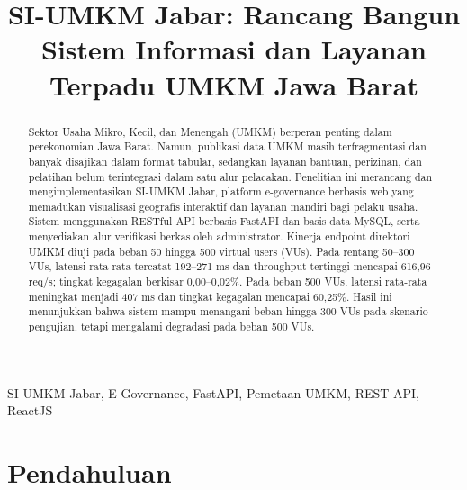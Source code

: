 \documentclass[conference]{IEEEtran}
\begin{document}
\title{SI-UMKM Jabar: Rancang Bangun Sistem Informasi dan Layanan Terpadu UMKM Jawa Barat}

\author{
}

\maketitle

\begin{abstract}
Sektor Usaha Mikro, Kecil, dan Menengah (UMKM) berperan penting dalam perekonomian Jawa Barat. Namun, publikasi data UMKM masih terfragmentasi dan banyak disajikan dalam format tabular, sedangkan layanan bantuan, perizinan, dan pelatihan belum terintegrasi dalam satu alur pelacakan. Penelitian ini merancang dan mengimplementasikan SI-UMKM Jabar, platform e-governance berbasis web yang memadukan visualisasi geografis interaktif dan layanan mandiri bagi pelaku usaha. Sistem menggunakan RESTful API berbasis FastAPI dan basis data MySQL, serta menyediakan alur verifikasi berkas oleh administrator. Kinerja endpoint direktori UMKM diuji pada beban 50 hingga 500 virtual users (VUs). Pada rentang 50--300 VUs, latensi rata-rata tercatat 192--271 ms dan throughput tertinggi mencapai 616,96 req/s; tingkat kegagalan berkisar 0,00--0,02\%. Pada beban 500 VUs, latensi rata-rata meningkat menjadi 407 ms dan tingkat kegagalan mencapai 60,25\%. Hasil ini menunjukkan bahwa sistem mampu menangani beban hingga 300 VUs pada skenario pengujian, tetapi mengalami degradasi pada beban 500 VUs.
\end{abstract}

\begin{IEEEkeywords}
SI-UMKM Jabar, E-Governance, FastAPI, Pemetaan UMKM, REST API, ReactJS
\end{IEEEkeywords}

\section{Pendahuluan}
\end{document}
